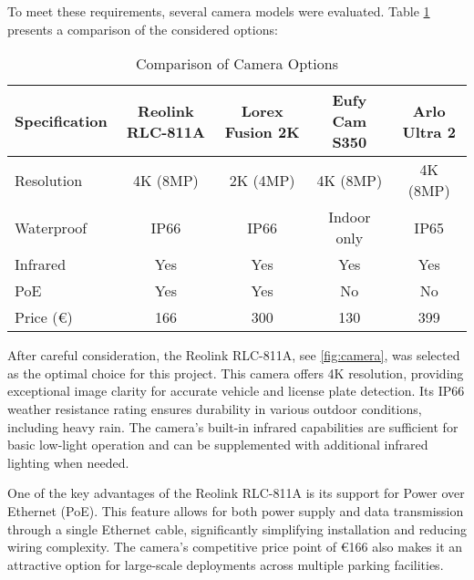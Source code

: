 To meet these requirements, several camera models were evaluated. Table \ref{tab:camera_comparison} presents a comparison of the considered options:

\begin{table}
	\begin{tabular}{|l|c|c|c|c|}
		\hline
		\textbf{Specification} & \textbf{Reolink RLC-811A} & \textbf{Lorex Fusion 2K} & \textbf{Eufy Cam S350} & \textbf{Arlo Ultra 2} \\
		\hline
		Resolution             & 4K (8MP)                  & 2K (4MP)                 & 4K (8MP)               & 4K (8MP)              \\
		\hline
		Waterproof             & IP66                      & IP66                     & Indoor only            & IP65                  \\
		\hline
		Infrared               & Yes                       & Yes                      & Yes                    & Yes                   \\
		\hline
		PoE                    & Yes                       & Yes                      & No                     & No                    \\
		\hline
		Price (\euro)          & 166                       & 300                      & 130                    & 399                   \\
		\hline
	\end{tabular}
	\caption{Comparison of Camera Options}\label{tab:camera_comparison}
\end{table}

After careful consideration, the Reolink RLC-811A, see \cref{fig:camera}, was selected as the optimal choice for this project. This camera offers 4K resolution, providing exceptional image clarity for accurate vehicle and license plate detection. Its IP66 weather resistance rating ensures durability in various outdoor conditions, including heavy rain. The camera's built-in infrared capabilities are sufficient for basic low-light operation and can be supplemented with additional infrared lighting when needed.

One of the key advantages of the Reolink RLC-811A is its support for Power over Ethernet (PoE). This feature allows for both power supply and data transmission through a single Ethernet cable, significantly simplifying installation and reducing wiring complexity. The camera's competitive price point of €166 also makes it an attractive option for large-scale deployments across multiple parking facilities.


